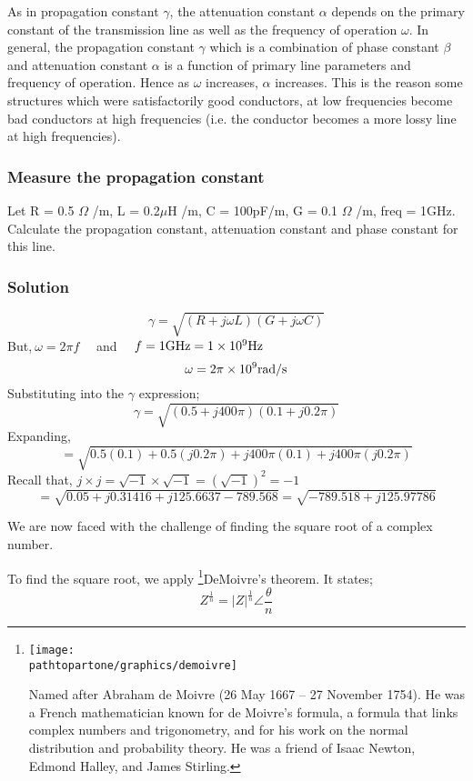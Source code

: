 As in propagation constant $\gamma$, the attenuation constant $\alpha$ depends on the primary constant of the transmission line as well as the frequency of operation $\omega$. In general, the propagation constant $\gamma$ which is a combination of phase constant $\beta$ and attenuation constant $\alpha$ is a function of primary line parameters and frequency of operation. Hence as $\omega$ increases, $\alpha$ increases. This is the reason some structures which were satisfactorily good conductors, at low frequencies become bad conductors at high frequencies (i.e. the conductor becomes a more lossy line at high frequencies).

\begin{exmp}
\subsubsection*{Measure the propagation constant}
Let R = 0.5 $\Omega$ /m, L = 0.2$\mu$H /m, C = 100pF/m, G = 0.1 $\Omega$ /m, freq = 1GHz. Calculate the propagation constant, attenuation constant and phase constant for this line.

\subsubsection*{Solution}
\[ \gamma = \sqrt{(R+j\omega L)(G + j\omega C)}\]
But,$ \ \omega = 2\pi f\quad$ and $\quad f = 1\textnormal{GHz} = 1 \times 10^9 \textnormal{Hz} $ 
\[\omega = 2\pi \times 10^9\textnormal{rad/s}\]
Substituting into the $ \gamma $ expression;
\[\gamma = \sqrt{(0.5 + j 400\pi)(0.1 + j 0.2\pi)}\]
Expanding,
\[ = \sqrt{0.5(0.1) + 0.5(j 0.2\pi) + j 400\pi(0.1) + j 400\pi(j 0.2\pi)}\]
Recall that, $ j \times j = \sqrt{-1} \times \sqrt{-1} = (\sqrt{-1})^2 = -1 $
\begin{dmath*}
=\sqrt{0.05 + j 0.31416 +j 125.6637 - 789.568}
= \sqrt{-789.518 + j 125.97786}
\end{dmath*}

We are now faced with the challenge of finding the square root of a complex number.

To find the square root, we apply \footnote{
\texttt{[image: \\pathtopartone/graphics/demoivre]}

Named after Abraham de Moivre (26 May 1667 – 27 November 1754). He was a French mathematician known for de Moivre's formula, a formula that links complex numbers and trigonometry, and for his work on the normal distribution and probability theory. He was a friend of Isaac Newton, Edmond Halley, and James Stirling.
}DeMoivre's theorem. It states; 
\begin{equation*}
Z^{\frac{1}{n}} = |Z|^{\frac{1}{n}}\angle\frac{\theta}{n}
\end{equation*}


\end{exmp}
